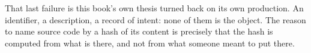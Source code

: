 
That last failure is this book's own thesis turned back on its own production. An
identifier, a description, a record of intent: none of them is the object. The reason to name
source code by a hash of its content is precisely that the hash is computed from what is there,
and not from what someone meant to put there.
